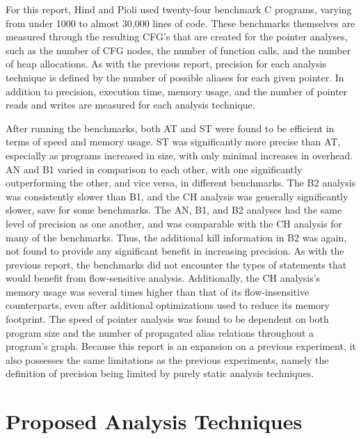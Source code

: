 For this report, Hind and Pioli used twenty-four benchmark C programs, varying from under 1000 to almost 30,000 lines of code. These benchmarks themselves are measured through the resulting CFG's that are created for the pointer analyses, such as the number of CFG nodes, the number of function calls, and the number of heap allocations. As with the previous report, precision for each analysis technique is defined by the number of possible aliases for each given pointer. In addition to precision, execution time, memory usage, and the number of pointer reads and writes are measured for each analysis technique.

After running the benchmarks, both AT and ST were found to be efficient in terms of speed and memory usage. ST was significantly more precise than AT, especially as programs increased in size, with only minimal increases in overhead. AN and B1 varied in comparison to each other, with one significantly outperforming the other, and vice versa, in different benchmarks. The B2 analysis was consistently slower than B1, and the CH analysis was generally significantly slower, save for some benchmarks. The AN, B1, and B2 analyses had the same level of precision as one another, and was comparable with the CH analysis for many of the benchmarks. Thus, the additional kill information in B2 was again, not found to provide any significant benefit in increasing precision. As with the previous report, the benchmarks did not encounter the types of statements that would benefit from flow-sensitive analysis. Additionally, the CH analysis's memory usage was several times higher than that of its flow-insensitive counterparts, even after additional optimizations used to reduce its memory footprint. The speed of pointer analysis was found to be dependent on both program size and the number of propagated alias relations throughout a program's graph. Because this report is an expansion on a previous experiment, it also possesses the same limitations as the previous experiments, namely the definition of precision being limited by purely static analysis techniques.

\section{Proposed Analysis Techniques}

